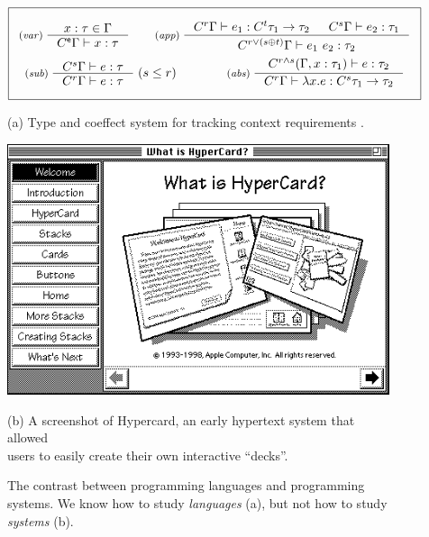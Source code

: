 \documentclass[runningheads]{llncs}
\newcommand{\ctyp}[2]{C^{#1}#2}
\newcommand{\imult}{\oplus}
\newcommand{\iunit}{\mathsf{e}}
\begin{document}
\begin{figure}[t]
\vspace{-0.5em}
\centering
\begin{equation*}
\boxed{\begin{array}{c}
\\[-0.5em]
\inference[(\emph{var})\;]
  {x : \tau \in \Gamma}
  {\ctyp{\iunit}{\Gamma} \vdash x : \tau }
%
\quad\quad
%
\inference[(\emph{app})\;]
  {\ctyp{r}{\Gamma} \vdash e_1 : \ctyp{t}{\tau_1} \rightarrow \tau_2 &
   \ctyp{s}{\Gamma} \vdash e_2 : \tau_1 }
  {\ctyp{r \vee (s \imult t)}{\Gamma} \vdash e_1~e_2 : \tau_2}
\\[1.2em]
\inference[(\emph{sub})\;]
  {\ctyp{s}{\Gamma} \vdash e : \tau }
  {\ctyp{r}{\Gamma} \vdash e : \tau }
\;(s\leq r)
%
\quad\quad\quad\quad
%
\inference[(\emph{abs})\;]
  {\ctyp{r \wedge s}{(\Gamma, x:\tau_1)} \vdash e : \tau_2}
  {\ctyp{r}{\Gamma} \vdash \lambda x.e : \ctyp{s}{\tau_1} \rightarrow \tau_2 }
\\[-0.5em]~
\end{array}}
\end{equation*}

\vspace{0.5em}
(a) Type and coeffect system for tracking context requirements \cite{petricek-2013-coeffects}.
\vspace{1.5em}

\includegraphics[scale=0.7]{figures/hyper.png}

\vspace{0.5em}
(b) A screenshot of Hypercard, an early hypertext system that allowed \\
users to easily create their own interactive ``decks''.
\vspace{0.5em}

\caption{The contrast between programming languages and programming systems. We know how to study \emph{languages} (a), but not how to study \emph{systems} (b). }
\label{fig:langsys}
\vspace{-0.5em}
\end{figure}
\end{document}

